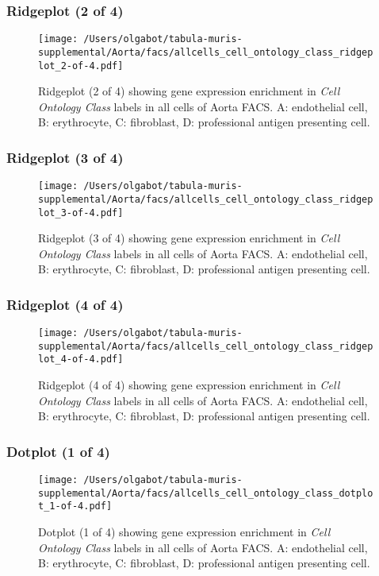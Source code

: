 \clearpage

\subsubsection{Ridgeplot (2 of 4)}
\begin{figure}[h]
\centering
\texttt{[image: /Users/olgabot/tabula-muris-supplemental/Aorta/facs/allcells\_cell\_ontology\_class\_ridgeplot\_2-of-4.pdf]}

\caption{ Ridgeplot (2 of 4)  showing gene expression enrichment in \emph{Cell Ontology Class} labels in all cells of Aorta FACS. A: endothelial cell, B: erythrocyte, C: fibroblast, D: professional antigen presenting cell.}
\end{figure}


\clearpage

\subsubsection{Ridgeplot (3 of 4)}
\begin{figure}[h]
\centering
\texttt{[image: /Users/olgabot/tabula-muris-supplemental/Aorta/facs/allcells\_cell\_ontology\_class\_ridgeplot\_3-of-4.pdf]}

\caption{ Ridgeplot (3 of 4)  showing gene expression enrichment in \emph{Cell Ontology Class} labels in all cells of Aorta FACS. A: endothelial cell, B: erythrocyte, C: fibroblast, D: professional antigen presenting cell.}
\end{figure}


\clearpage

\subsubsection{Ridgeplot (4 of 4)}
\begin{figure}[h]
\centering
\texttt{[image: /Users/olgabot/tabula-muris-supplemental/Aorta/facs/allcells\_cell\_ontology\_class\_ridgeplot\_4-of-4.pdf]}

\caption{ Ridgeplot (4 of 4)  showing gene expression enrichment in \emph{Cell Ontology Class} labels in all cells of Aorta FACS. A: endothelial cell, B: erythrocyte, C: fibroblast, D: professional antigen presenting cell.}
\end{figure}


\clearpage

\subsubsection{Dotplot (1 of 4)}
\begin{figure}[h]
\centering
\texttt{[image: /Users/olgabot/tabula-muris-supplemental/Aorta/facs/allcells\_cell\_ontology\_class\_dotplot\_1-of-4.pdf]}

\caption{ Dotplot (1 of 4)  showing gene expression enrichment in \emph{Cell Ontology Class} labels in all cells of Aorta FACS. A: endothelial cell, B: erythrocyte, C: fibroblast, D: professional antigen presenting cell.}
\end{figure}


